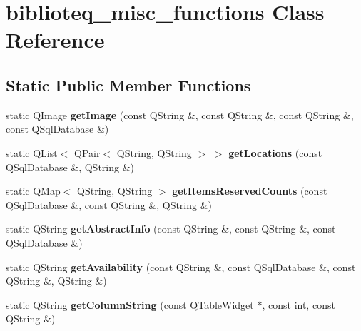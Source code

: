 \hypertarget{classbiblioteq__misc__functions}{}\section{biblioteq\+\_\+misc\+\_\+functions Class Reference}
\label{classbiblioteq__misc__functions}
\subsection*{Static Public Member Functions}
\begin{DoxyCompactItemize}
\item 
static Q\+Image {\bfseries get\+Image} (const Q\+String \&, const Q\+String \&, const Q\+String \&, const Q\+Sql\+Database \&)\hypertarget{classbiblioteq__misc__functions_a202131d0a1090d2ff0ada2c9fed87943}{}\label{classbiblioteq__misc__functions_a202131d0a1090d2ff0ada2c9fed87943}

\item 
static Q\+List$<$ Q\+Pair$<$ Q\+String, Q\+String $>$ $>$ {\bfseries get\+Locations} (const Q\+Sql\+Database \&, Q\+String \&)\hypertarget{classbiblioteq__misc__functions_adb6fdddf07956cef35566c3dfbb66588}{}\label{classbiblioteq__misc__functions_adb6fdddf07956cef35566c3dfbb66588}

\item 
static Q\+Map$<$ Q\+String, Q\+String $>$ {\bfseries get\+Items\+Reserved\+Counts} (const Q\+Sql\+Database \&, const Q\+String \&, Q\+String \&)\hypertarget{classbiblioteq__misc__functions_a883dea962f665d0305e560b9b98bba72}{}\label{classbiblioteq__misc__functions_a883dea962f665d0305e560b9b98bba72}

\item 
static Q\+String {\bfseries get\+Abstract\+Info} (const Q\+String \&, const Q\+String \&, const Q\+Sql\+Database \&)\hypertarget{classbiblioteq__misc__functions_a56536416e14c8ee1e76777558135fcd0}{}\label{classbiblioteq__misc__functions_a56536416e14c8ee1e76777558135fcd0}

\item 
static Q\+String {\bfseries get\+Availability} (const Q\+String \&, const Q\+Sql\+Database \&, const Q\+String \&, Q\+String \&)\hypertarget{classbiblioteq__misc__functions_a7727c6f385d1377c0ad3bc8d6cbab0ec}{}\label{classbiblioteq__misc__functions_a7727c6f385d1377c0ad3bc8d6cbab0ec}

\item 
static Q\+String {\bfseries get\+Column\+String} (const Q\+Table\+Widget $\ast$, const int, const Q\+String \&)\hypertarget{classbiblioteq__misc__functions_a9d727adc0e5f36988d7298dbe3b84179}{}\label{classbiblioteq__misc__functions_a9d727adc0e5f36988d7298dbe3b84179}


\end{DoxyCompactItemize}
